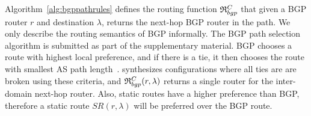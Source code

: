  \iffull
Algorithm~\ref{alg:bgppathrules} defines the routing function 
$\mathfrak{R}_{bgp}^C$ 
that given 
a BGP router $r$
and destination  
$\lambda$,
returns 
the next-hop BGP router in the path. 
\else
We only describe the routing semantics of BGP
informally. The BGP path selection algorithm is submitted as part of the supplementary material.
\fi
BGP 
chooses a route with highest local preference, and
if there is a tie, it then chooses the route with smallest
AS path length~\cite{bgp}. 
\name synthesizes configurations where all ties are 
are broken using these criteria, and $\mathfrak{R}_{bgp}^C(r,\lambda)$
returns a single router for the inter-domain next-hop router. 
Also, static routes 
have a higher preference than BGP, therefore a static route
$SR(r, \lambda)$ will be preferred over the BGP route.

